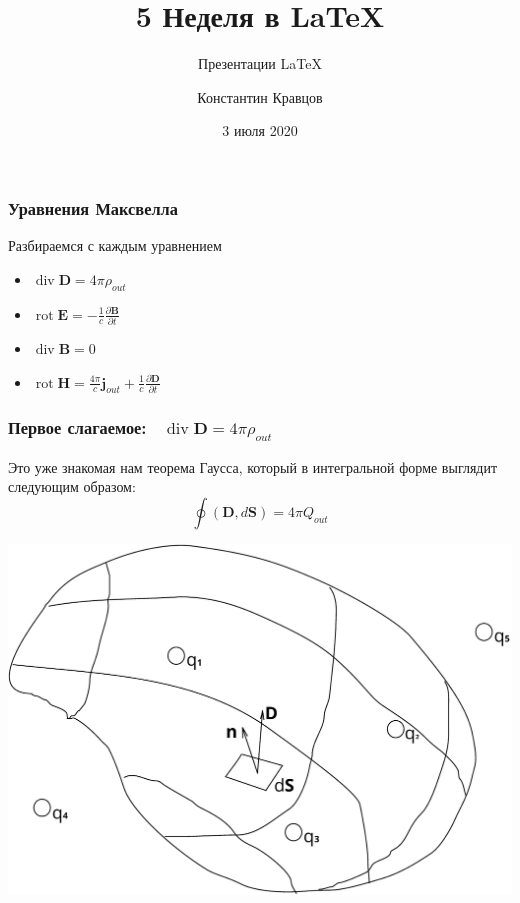 \documentclass[t]{beamer}  %
\title{5 Неделя в \LaTeX}
\subtitle{Презентации \LaTeX}
\author{Константин Кравцов}
\date{3 июля 2020}
\institute[МФТИ]{Национальный исследовательский университет \\ <<МФТИ>>}
\DeclareMathOperator{\divergence}{\mathop{div}} %
\DeclareMathOperator{\rot}{\mathop{rot}} %
\begin{document}
\begin{frame}
	\maketitle
\end{frame}

\begin{frame}
	\frametitle{Уравнения Максвелла}
	Разбираемся с каждым уравнением
		\begin{itemize}
		\item $\displaystyle\divergence \textbf{D} = 4\pi\rho_{out}$
		\item $\displaystyle\rot \textbf{E} = - \frac{1}{c} \frac{\partial \textbf{B}}{\partial t}$
		\item $\displaystyle\divergence \textbf{B} = 0$
		\item $\displaystyle\rot \textbf{H} = \frac{4 \pi}{c} \textbf{j}_{out} + \frac{1}{c} \frac{\partial \textbf{D}}{\partial t}$
		\end{itemize}
\end{frame}

\begin{frame}
	\frametitle{Первое слагаемое: \ $\divergence \textbf{D} = 4\pi\rho_{out}$} %
		Это уже знакомая нам теорема Гаусса, который в интегральной форме выглядит следующим образом:\\
		\[
			\oint \left(\textbf{D}, d\textbf{S}\right) = 4\pi Q_{out}
		\]
		\begin{center}
		\includegraphics[scale=0.33333]{Thgauss}
		\end{center}
\end{frame}
\end{document}

